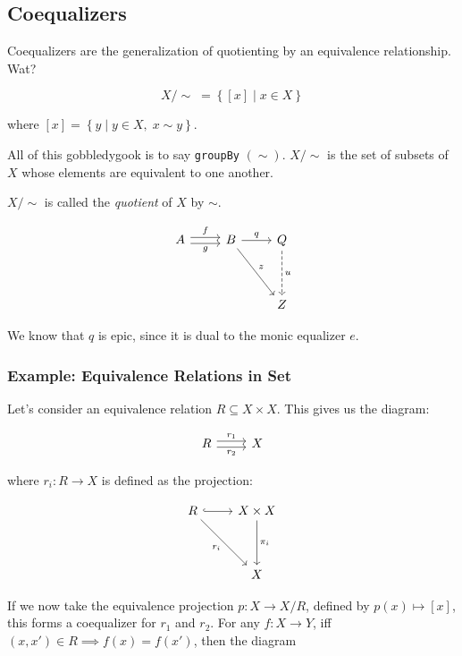 \documentclass[]{article}
\newcommand{\setn}[1]{\left\{#1\right\}}
\newcommand{\tfarr}[4][\to]{\ensuremath{#2 : #3 #1 #4}}
\begin{document}
\subsection{Coequalizers}

Coequalizers are the generalization of quotienting by an equivalence
relationship. Wat?

$$
X/\!\sim\;= \setn{[x]\;|\;x \in X}
$$

where $[x] = \setn{y\;|\;y\in X, \;x \sim y}$.

All of this gobbledygook is to say \texttt{groupBy} $(\sim)$. $X/\!\sim$ is the
set of subsets of $X$ whose elements are equivalent to one another.

$X/\!\sim$ is called the \emph{quotient} of $X$ by $\sim$.

$$\begin{tikzcd}
  A \arrow[shift right=1,swap]{r}{g} \arrow[shift left=1]{r}{f} & B
  \arrow{ddr}{z} \arrow{r}{q} & Q \arrow[dashed]{dd}{u} \\
  & & \\
  & & Z
\end{tikzcd}$$

We know that $q$ is epic, since it is dual to the monic equalizer $e$.


\subsubsection{Example: Equivalence Relations in Set}

Let's consider an equivalence relation $R \subseteq X\times X$. This gives us
the diagram:

$$\begin{tikzcd}
  R \arrow[shift left=1]{r}{r_1} \arrow[shift right=1,swap]{r}{r_2} & X
\end{tikzcd}$$

where \tfarr{r_i}{R}{X} is defined as the projection:

$$\begin{tikzcd}
  R \arrow[hookrightarrow]{r} \arrow[swap]{ddr}{r_i} & X\times X \arrow{dd}{\pi_i} \\
  & \\
  & X
\end{tikzcd}$$

If we now take the equivalence projection \tfarr{p}{X}{X/R}, defined by $p(x)
\mapsto [x]$, this forms a coequalizer for $r_1$ and $r_2$. For any
\tfarr{f}{X}{Y}, iff $(x, x') \in R \implies f(x) = f(x')$, then the diagram
\end{document}
